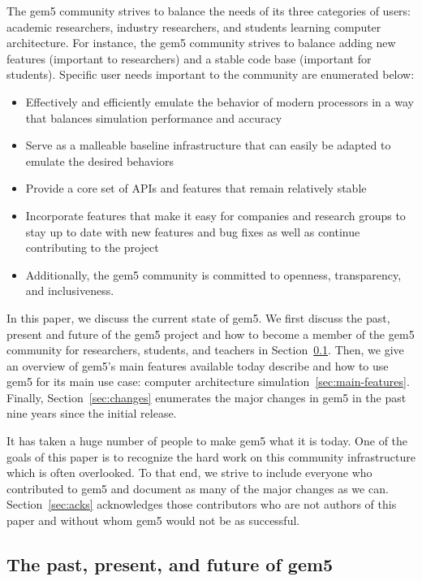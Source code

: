 The gem5 community strives to balance the needs of its three categories of users: academic researchers, industry researchers, and students learning computer architecture.
For instance, the gem5 community strives to balance adding new features (important to researchers) and a stable code base (important for students).
Specific user needs important to the community are enumerated below:
\begin{itemize}
    \item Effectively and efficiently emulate the behavior of modern processors in a way that balances simulation performance and accuracy
    \item Serve as a malleable baseline infrastructure that can easily be adapted to emulate the desired behaviors
    \item Provide a core set of APIs and features that remain relatively stable
    \item Incorporate features that make it easy for companies and research groups to stay up to date with new features and bug fixes as well as continue contributing to the project
    \item Additionally, the gem5 community is committed to openness, transparency, and inclusiveness.
\end{itemize}

In this paper, we discuss the current state of gem5.
We first discuss the past, present and future of the gem5 project and how to become a member of the gem5 community for researchers, students, and teachers in Section~\ref{sec:current-gem5}.
Then, we give an overview of gem5's main features available today describe and how to use gem5 for its main use case: computer architecture simulation~\ref{sec:main-features}.
Finally, Section~\ref{sec:changes} enumerates the major changes in gem5 in the past nine years since the initial release.

It has taken a huge number of people to make gem5 what it is today.
One of the goals of this paper is to recognize the hard work on this community infrastructure which is often overlooked.
To that end, we strive to include everyone who contributed to gem5 and document as many of the major changes as we can.
Section~\ref{sec:acks} acknowledges those contributors who are not authors of this paper and without whom gem5 would not be as successful.

\subsection{The past, present, and future of gem5}\label{sec:current-gem5}

